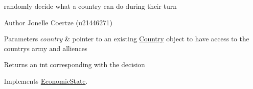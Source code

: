 randomly decide what a country can do during their turn 

\begin{DoxyAuthor}{Author}
Jonelle Coertze (u21446271) 
\end{DoxyAuthor}

\begin{DoxyParams}{Parameters}
{\em country} & pointer to an existing \mbox{\hyperlink{class_country}{Country}} object to have access to the country\textquotesingle{}s army and alliences \\
\hline
\end{DoxyParams}
\begin{DoxyReturn}{Returns}
an int corresponding with the decision 
\end{DoxyReturn}


Implements \mbox{\hyperlink{class_economic_state_aedab93435d9f685c76b9eb327c04e0ad}{Economic\+State}}.


